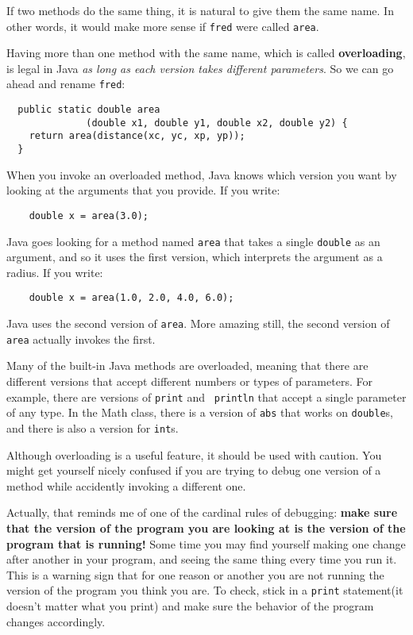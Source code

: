 \documentclass{book}
\begin{document}
If two methods do the same thing, it is natural to give them
the same name.  In other words, it would make more sense if
{\tt fred} were called {\tt area}.

Having more than one method with the same name, which is called {\bf
overloading}, is legal in Java {\em as long as each version takes
different parameters}.  So we can go ahead and rename {\tt fred}:

\begin{verbatim}
  public static double area
              (double x1, double y1, double x2, double y2) {
    return area(distance(xc, yc, xp, yp));
  } 
\end{verbatim}
%
When you invoke an overloaded method, Java knows which version you
want by looking at the arguments that you provide.  If you write:

\begin{verbatim}
    double x = area(3.0);
\end{verbatim}
%
Java goes looking for a method named {\tt area} that
takes a single {\tt double} as an argument, and so it uses the
first version, which interprets the argument as a radius.
If you write:

\begin{verbatim}
    double x = area(1.0, 2.0, 4.0, 6.0);
\end{verbatim}
%
Java uses the second version of {\tt area}.  More amazing
still, the second version of {\tt area} actually invokes the
first.

Many of the built-in Java methods are overloaded, meaning that there
are different versions that accept different numbers or types of
parameters.  For example, there are versions of {\tt print} and {\tt
println} that accept a single parameter of any type.  In the Math
class, there is a version of {\tt abs} that works on {\tt double}s,
and there is also a version for {\tt int}s.

Although overloading is a useful feature, it should be used
with caution.  You might get yourself nicely confused if you
are trying to debug one version of a method while accidently
invoking a different one.

Actually, that reminds me of one of the cardinal rules of
debugging: {\bf make sure that the version of the program
you are looking at is the version of the program that is running!}
Some time you may find yourself making one change after another
in your program, and seeing the same thing every time you run it.
This is a warning sign that for one reason or another you are
not running the version of the program you think you are.  To
check, stick in a {\tt print} statement(it doesn't matter what
you print) and make sure the behavior of the program changes
accordingly.
\end{document}
